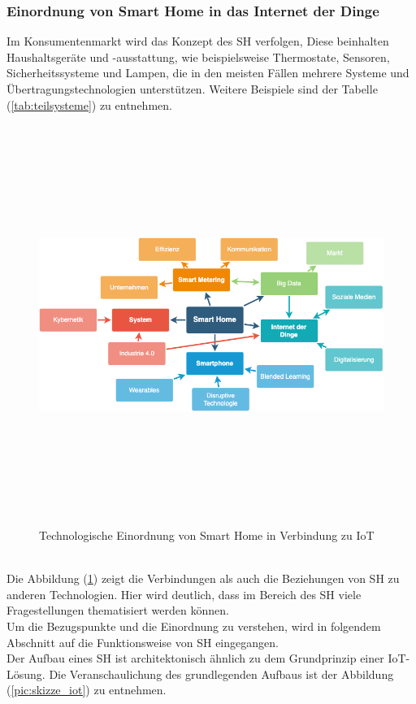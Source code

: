     \subsubsection*{Einordnung von Smart Home in das Internet der Dinge}
        Im Konsumentenmarkt wird %
        das Konzept des \acl{SH} verfolgen,  
        Diese beinhalten Haushaltsgeräte und -ausstattung, wie beispielsweise Thermostate, Sensoren, Sicherheitssysteme und Lampen, die in den meisten 
        Fällen mehrere Systeme und Übertragungstechnologien unterstützen. Weitere Beispiele sind der Tabelle (\ref{tab:teilsysteme}) zu entnehmen. 
        \begin{figure}[hbt!]
            \centering
            \includegraphics[width=13cm,height=13cm,keepaspectratio]{images/SH-Mind_Map.png}
            \caption{Technologische Einordnung von Smart Home in Verbindung zu IoT \cite{shmindmap2021}}
            \label{pic:mindmap_SH-IoT}
        \end{figure}
        \\
        \linebreak
        Die Abbildung (\ref{pic:mindmap_SH-IoT}) zeigt die Verbindungen als auch die Beziehungen von \acl{SH} zu anderen Technologien. Hier wird 
        deutlich, dass im Bereich des \acl{SH} viele Fragestellungen thematisiert werden können. 
        \\
        \linebreak
        Um die Bezugspunkte und die Einordnung zu verstehen, wird in folgendem Abschnitt auf die Funktionsweise von \acl{SH} eingegangen.
        \\ 
        Der Aufbau eines \acl{SH} ist architektonisch ähnlich zu dem Grundprinzip einer \acs{IoT}-Lösung. Die Veranschaulichung des 
        grundlegenden Aufbaus ist der Abbildung (\ref{pic:skizze_iot}) zu entnehmen. 


